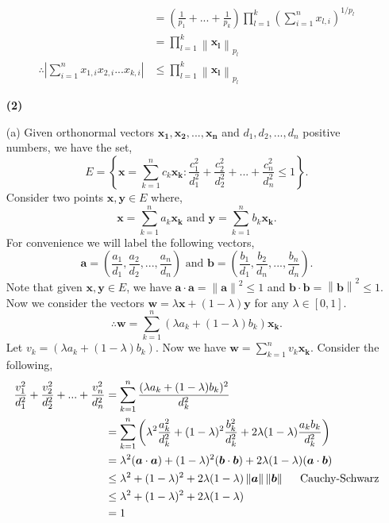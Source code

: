 \documentclass[a4paper]{article}
\newcommand{\norm}[1]{\left\lVert#1\right\rVert}
\begin{document}
\begin{enumerate}[leftmargin=\labelsep]
\begin{align*}
			& = \left(\frac{1}{p_1} + ... + \frac{1}{p_k}\right) \prod_{l = 1}^k \left(\sum_{i = 1}^n x_{l,i}\right)^{1 / p_l} \\
			& = \prod_{l = 1}^k \norm{\bm{x_l}}_{p_l} \\
			\therefore \left|\sum_{i = 1}^n x_{1,i}x_{2,i}...x_{k,i}\right| & \leq \prod_{l = 1}^k \norm{\bm{x_l}}_{p_l}
		\end{align*}
	\item[\textbf{(2)}]
	\item[(a)]
		Given orthonormal vectors $\bm{x_1}, \bm{x_2}, ..., \bm{x_n}$ and $d_1, d_2, ..., d_n$ positive numbers, we have the set,
		$$E = \left\{ \bm{x} = \sum_{k = 1}^n c_k \bm{x_k} : \frac{c_1^2}{d_1^2} + \frac{c_2^2}{d_2^2} + ... + \frac{c_n^2}{d_n^2} \leq 1 \right\}.$$
		Consider two points $\bm{x}, \bm{y} \in E$ where,
		$$\bm{x} = \sum_{k = 1}^n a_k \bm{x_k} \text{ and } \bm{y} = \sum_{k = 1}^n b_k \bm{x_k}.$$
		For convenience we will label the following vectors,
		$$\bm{a} = \left(\frac{a_1}{d_1}, \frac{a_2}{d_2}, ... , \frac{a_n}{d_n}\right) \text{ and } \bm{b} = \left(\frac{b_1}{d_1}, \frac{b_2}{d_n}, ... , \frac{b_n}{d_n}\right).$$
		Note that given $\bm{x}, \bm{y} \in E$, we have $\bm{a} \cdot \bm{a} = \norm{\bm{a}}^2 \leq 1$ and $\bm{b} \cdot \bm{b} = \norm{\bm{b}}^2 \leq 1.$
		Now we consider the vectors $\bm{w} = \lambda \bm{x} + (1 - \lambda) \bm{y}$ for any $\lambda \in [0,1].$
		$$\therefore \bm{w} = \sum_{k = 1}^n (\lambda a_k + (1 - \lambda) b_k)\bm{x_k}.$$
		Let $v_k = (\lambda a_k + (1 - \lambda) b_k).$ Now we have $\displaystyle \bm{w} = \sum_{k = 1}^n v_k\bm{x_k}.$ Consider the following,
		\begin{align*}
			\frac{v_1^2}{d_1^2} + \frac{v_2^2}{d_2^2} + ... + \frac{v_n^2}{d_n^2} & = \sum_{k = 1}^n \frac{(\lambda a_k + (1 - \lambda) b_k)^2}{d_k^2} \\
			& = \sum_{k = 1}^n \left(\lambda^2 \frac{a_k^2}{d_k^2} + (1 - \lambda)^2 \frac{b_k^2}{d_k^2} + 2\lambda(1 - \lambda) \frac{a_kb_k}{d_k^2}\right) \\
			& = \lambda^2 (\bm{a} \cdot \bm{a}) + (1 - \lambda)^2 (\bm{b} \cdot \bm{b}) + 2\lambda(1 - \lambda) (\bm{a} \cdot \bm{b}) \\
			& \leq \lambda^2 + (1 - \lambda)^2 + 2\lambda(1 - \lambda) \norm{\bm{a}} \norm{\bm{b}} \hspace{5mm} \text{Cauchy-Schwarz} \\
			& \leq \lambda^2 + (1 - \lambda)^2 + 2\lambda(1 - \lambda) \\
			& = 1
		\end{align*}

\end{enumerate}
\end{document}

